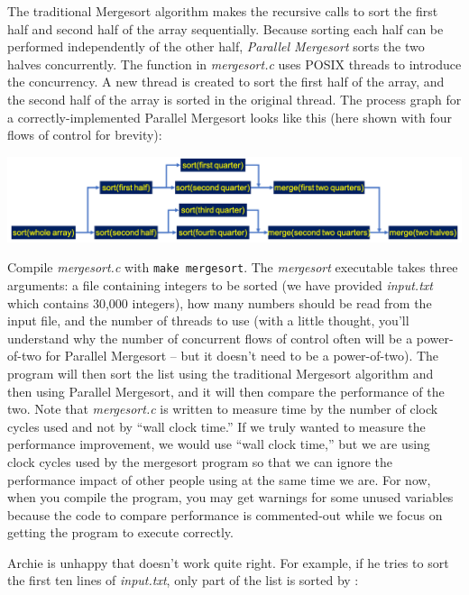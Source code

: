 The traditional Mergesort algorithm makes the recursive calls to sort the first
half and second half of the array sequentially. Because sorting each half can
be performed independently of the other half, \textit{Parallel Mergesort} sorts
the two halves concurrently. The  function in
\textit{mergesort.c} uses POSIX threads to introduce the concurrency. A new
thread is created to sort the first half of the array, and the second half of
the array is sorted in the original thread. The process graph for a
correctly-implemented Parallel Mergesort looks like this (here shown with four
flows of control for brevity):

\includegraphics[scale=0.5]{mergesort-graph}

Compile \textit{mergesort.c} with \texttt{make mergesort}. The
\textit{mergesort} executable takes three arguments: a file containing integers
to be sorted (we have provided \textit{input.txt} which contains 30,000
integers), how many numbers should be read from the input file, and the number
of threads to use (with a little thought, you'll understand why the number of
concurrent flows of control often will be a power-of-two for Parallel Mergesort
-- but it doesn't need to be a power-of-two). The program will then sort the
list using the traditional Mergesort algorithm and then using Parallel
Mergesort, and it will then compare the performance of the two. Note that
\textit{mergesort.c} is written to measure time by the number of clock cycles
used and not by ``wall clock time.'' If we truly wanted to measure the
performance improvement, we would use ``wall clock time,'' but we are using
clock cycles used by the mergesort program so that we can ignore the
performance impact of other people using \runtimeenvironment at the same time
we are. For now, when you compile the program, you may get warnings for some
unused variables because the code to compare performance is commented-out while
we focus on getting the program to execute correctly.

Archie is unhappy that  doesn't work quite right.
For example, if he tries to sort the first ten lines of \textit{input.txt},
only part of the list is sorted by :

